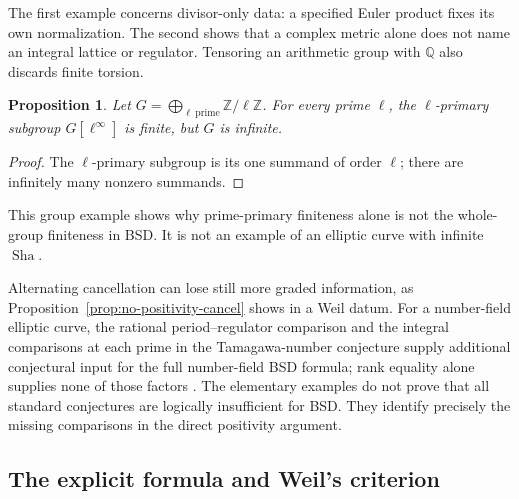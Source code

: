 \documentclass[11pt]{amsart}
\theoremstyle{plain}
\newtheorem{proposition}[theorem]{Proposition}
\theoremstyle{definition}
\theoremstyle{remark}
\numberwithin{equation}{section}
\newcommand{\Q}{\mathbb{Q}}
\newcommand{\Z}{\mathbb{Z}}
\newcommand{\Sha}{\operatorname{Sha}}
\begin{document}
The first example concerns divisor-only data: a specified Euler
product fixes its own normalization. The second shows that a complex
metric alone does not name an integral lattice or regulator.
Tensoring an arithmetic group with $\Q$ also discards finite torsion.

\begin{proposition}\label{prop:bsd-primary-gap}
Let $G=\bigoplus_{\ell\ \mathrm{prime}}\Z/\ell\Z$. For every prime
$\ell$, the $\ell$-primary subgroup $G[\ell^\infty]$ is finite,
but $G$ is infinite.
\end{proposition}
\begin{proof}
The $\ell$-primary subgroup is its one summand of order $\ell$;
there are infinitely many nonzero summands.
\end{proof}

This group example shows why prime-primary finiteness alone is not
the whole-group finiteness in BSD. It is not an example of an
elliptic curve with infinite $\Sha$.

Alternating cancellation can lose still more graded information, as
Proposition~\ref{prop:no-positivity-cancel} shows in a Weil datum.
For a number-field elliptic curve, the rational period--regulator
comparison and the integral comparisons at each prime in the
Tamagawa-number conjecture supply additional conjectural input for
the full number-field BSD formula; rank equality alone supplies
none of those factors
\cite[\S\S1--3, Conjectures~1--3 and \S5.4]{Flach2004ETNC}.
The elementary examples do not prove that all standard conjectures
are logically insufficient for BSD. They identify precisely the
missing comparisons in the direct positivity argument.

\subsection{The explicit formula and Weil's
criterion}\label{subsec:prior-weil}
\end{document}
